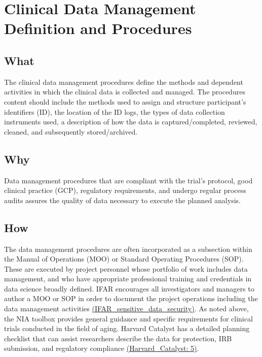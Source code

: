 \documentclass[]{book}
\theoremstyle{definition}
\theoremstyle{definition}
\theoremstyle{definition}
\theoremstyle{remark}
\begin{document}
\section{Clinical Data Management Definition and
Procedures}\label{clinical-data-management-definition-and-procedures}

\subsection{What}\label{what-20}

The clinical data management procedures define the methods and dependent
activities in which the clinical data is collected and managed. The
procedures content should include the methods used to assign and
structure participant's identifiers (ID), the location of the ID logs,
the types of data collection instruments used, a description of how the
data is captured/completed, reviewed, cleaned, and subsequently
stored/archived.

\subsection{Why}\label{why-20}

Data management procedures that are compliant with the trial's protocol,
good clinical practice (GCP), regulatory requirements, and undergo
regular process audits assures the quality of data necessary to execute
the planned analysis.

\subsection{How}\label{how-20}

The data management procedures are often incorporated as a subsection
within the Manual of Operations (MOO) or Standard Operating Procedures
(SOP). These are executed by project personnel whose portfolio of work
includes data management, and who have appropriate professional training
and credentials in data science broadly defined. IFAR encourages all
investigators and managers to author a MOO or SOP in order to document
the project operations including the data management activities
\href{http://thehslhub/~/media/HSLNet/P_P/IFAR/IFARPPSensitiveDataSecurity.ashx}{(IFAR\_sensitive\_data\_security)}.
As noted above, the NIA toolbox provides general guidance and specific
requirements for clinical trials conducted in the field of aging.
Harvard Catalyst has a detailed planning checklist that can assist
researchers describe the data for protection, IRB submission, and
regulatory compliance
\href{https://catalyst.harvard.edu/pdf/regulatory/Investigators\%20Guide\%20to\%20RDM\%20practice.pdf}{(Harvard\_Catalyst:
5)}.
\end{document}

